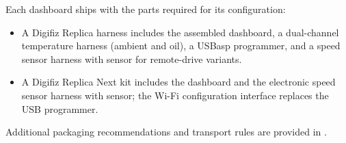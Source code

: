 Each dashboard ships with the parts required for its configuration:
\begin{itemize}
    \item A Digifiz Replica harness includes the assembled dashboard, a dual-channel temperature harness (ambient and oil), a USBasp programmer, and a speed sensor harness with sensor for remote-drive variants.
    \item A Digifiz Replica Next kit includes the dashboard and the electronic speed sensor harness with sensor; the Wi-Fi configuration interface replaces the USB programmer.
\end{itemize}

Additional packaging recommendations and transport rules are provided in .
